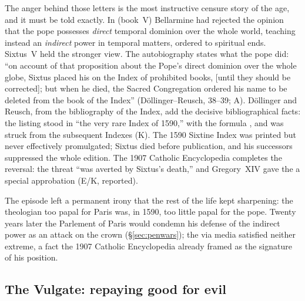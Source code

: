 The anger behind those letters is the most instructive censure
story of the age, and it must be told exactly. In  (book~V) Bellarmine had rejected the opinion that the
pope possesses \emph{direct} temporal dominion over the whole
world, teaching instead an \emph{indirect} power in temporal
matters, ordered to spiritual ends. Sixtus~V held the stronger
view. The autobiography states what the pope did: ``on account of
that proposition about the Pope's direct dominion over the whole
globe, Sixtus placed his  on the Index of
prohibited books,  [until they should be
corrected]; but when he died, the Sacred Congregation ordered his
name to be deleted from the book of the Index''
(D\"ollinger--Reusch, 38--39; A). D\"ollinger and Reusch, from the
bibliography of the Index, add the decisive bibliographical facts:
the listing stood in ``the very rare Index of 1590,'' with the
formula , and was struck from the
subsequent Indexes (K). The 1590 Sixtine Index was printed but
never effectively promulgated; Sixtus died before publication, and
his successors suppressed the whole edition. The 1907 Catholic
Encyclopedia completes the reversal: the threat ``was averted by
Sixtus's death,'' and Gregory~XIV gave the  a
special approbation (E/K, reported).


The episode left a permanent irony that the rest of the life kept
sharpening: the theologian too papal for Paris was, in 1590, too
little papal for the pope. Twenty years later the Parlement of
Paris would condemn his defense of the indirect power as an attack
on the crown (\S\ref{sec:penwars}); the via media satisfied
neither extreme, a fact the 1907 Catholic Encyclopedia already
framed as the signature of his position.

\subsection{The Vulgate: repaying good for evil}

